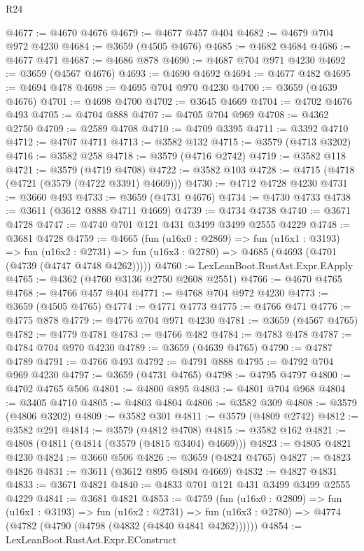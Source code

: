 \begin{lexlean}{R24}
\begin{coremodule}
@4677 := @4670 @4676
@4679 := @4677 @457 @404
@4682 := @4679 @704 @972 @4230
@4684 := @3659 (@4505 @4676)
@4685 := @4682 @4684
@4686 := @4677 @471
@4687 := @4686 @878
@4690 := @4687 @704 @971 @4230
@4692 := @3659 (@4567 @4676)
@4693 := @4690 @4692
@4694 := @4677 @482
@4695 := @4694 @478
@4698 := @4695 @704 @970 @4230
@4700 := @3659 (@4639 @4676)
@4701 := @4698 @4700
@4702 := @3645 @4669
@4704 := @4702 @4676 @493
@4705 := @4704 @888
@4707 := @4705 @704 @969
@4708 := @4362 @2750
@4709 := @2589 @4708
@4710 := @4709 @3395
@4711 := @3392 @4710
@4712 := @4707 @4711
@4713 := @3582 @132
@4715 := @3579 (@4713 @3202)
@4716 := @3582 @258
@4718 := @3579 (@4716 @2742)
@4719 := @3582 @118
@4721 := @3579 (@4719 @4708)
@4722 := @3582 @103
@4728 := @4715 (@4718 (@4721 (@3579 (@4722 @3391) @4669)))
@4730 := @4712 @4728 @4230
@4731 := @3660 @493
@4733 := @3659 (@4731 @4676)
@4734 := @4730 @4733
@4738 := @3611 (@3612 @888 @4711 @4669)
@4739 := @4734 @4738
@4740 := @3671 @4728
@4747 := @4740 @701 @121 @431 @3499 @3499 @2555 @4229
@4748 := @3681 @4728
@4759 := @4665
    (fun (u16x0 : @2869) =>
    fun (u16x1 : @3193) =>
    fun (u16x2 : @2731) => fun (u16x3 : @2780) => @4685 (@4693 (@4701 (@4739 (@4747 @4748 @4262)))))
@4760 := LexLeanBoot.RustAst.Expr.EApply
@4765 := @4362 (@4760 @3136 @2750 @2608 @2551)
@4766 := @4670 @4765
@4768 := @4766 @457 @404
@4771 := @4768 @704 @972 @4230
@4773 := @3659 (@4505 @4765)
@4774 := @4771 @4773
@4775 := @4766 @471
@4776 := @4775 @878
@4779 := @4776 @704 @971 @4230
@4781 := @3659 (@4567 @4765)
@4782 := @4779 @4781
@4783 := @4766 @482
@4784 := @4783 @478
@4787 := @4784 @704 @970 @4230
@4789 := @3659 (@4639 @4765)
@4790 := @4787 @4789
@4791 := @4766 @493
@4792 := @4791 @888
@4795 := @4792 @704 @969 @4230
@4797 := @3659 (@4731 @4765)
@4798 := @4795 @4797
@4800 := @4702 @4765 @506
@4801 := @4800 @895
@4803 := @4801 @704 @968
@4804 := @3405 @4710
@4805 := @4803 @4804
@4806 := @3582 @309
@4808 := @3579 (@4806 @3202)
@4809 := @3582 @301
@4811 := @3579 (@4809 @2742)
@4812 := @3582 @291
@4814 := @3579 (@4812 @4708)
@4815 := @3582 @162
@4821 := @4808 (@4811 (@4814 (@3579 (@4815 @3404) @4669)))
@4823 := @4805 @4821 @4230
@4824 := @3660 @506
@4826 := @3659 (@4824 @4765)
@4827 := @4823 @4826
@4831 := @3611 (@3612 @895 @4804 @4669)
@4832 := @4827 @4831
@4833 := @3671 @4821
@4840 := @4833 @701 @121 @431 @3499 @3499 @2555 @4229
@4841 := @3681 @4821
@4853 := @4759
    (fun (u16x0 : @2809) =>
    fun (u16x1 : @3193) =>
    fun (u16x2 : @2731) =>
    fun (u16x3 : @2780) => @4774 (@4782 (@4790 (@4798 (@4832 (@4840 @4841 @4262))))))
@4854 := LexLeanBoot.RustAst.Expr.EConstruct

\end{coremodule}
\end{lexlean}
